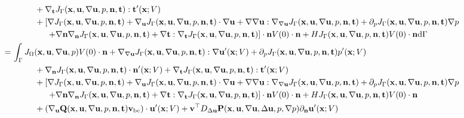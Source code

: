 \documentclass[oneside]{book}
\numberwithin{equation}{section}
\begin{document}
\begin{enumerate}[leftmargin=0in]
\begin{align*}
        &\hspace{1cm}+ \nabla_{\bf t}J_\Gamma({\bf x},{\bf u},\nabla{\bf u},p,{\bf n},{\bf t}):{\bf t}'({\bf x};V)\\
        &\hspace{1cm}+ \left[\nabla J_\Gamma({\bf x},{\bf u},\nabla{\bf u},p,{\bf n},{\bf t}) + \nabla_{\bf u}J_\Gamma({\bf x},{\bf u},\nabla{\bf u},p,{\bf n},{\bf t})\cdot\nabla{\bf u} + \nabla\nabla{\bf u}:\nabla_{\nabla{\bf u}}J_\Gamma({\bf x},{\bf u},\nabla{\bf u},p,{\bf n},{\bf t}) + \partial_pJ_\Gamma({\bf x},{\bf u},\nabla{\bf u},p,{\bf n},{\bf t})\nabla p\right.\\
        &\hspace{15mm} \left.+ \nabla{\bf n}\nabla_{\bf n}J_\Gamma({\bf x},{\bf u},\nabla{\bf u},p,{\bf n},{\bf t}) + \nabla{\bf t}:\nabla_{\bf t}J_\Gamma({\bf x},{\bf u},\nabla{\bf u},p,{\bf n},{\bf t})\right]\cdot{\bf n}V(0)\cdot{\bf n} + HJ_\Gamma({\bf x},{\bf u},\nabla{\bf u},p,{\bf n},{\bf t})V(0)\cdot{\bf n}{\rm d}\Gamma\\
        =&\, \int_\Gamma J_\Omega({\bf x},{\bf u},\nabla{\bf u},p)V(0)\cdot{\bf n} + \nabla_{\nabla{\bf u}}J_\Gamma({\bf x},{\bf u},\nabla{\bf u},p,{\bf n},{\bf t}):\nabla{\bf u}'({\bf x};V) + \partial_pJ_\Gamma({\bf x},{\bf u},\nabla{\bf u},p,{\bf n},{\bf t})p'({\bf x};V)\\
        &\hspace{1cm}+ \nabla_{\bf n}J_\Gamma({\bf x},{\bf u},\nabla{\bf u},p,{\bf n},{\bf t})\cdot{\bf n}'({\bf x};V) + \nabla_{\bf t}J_\Gamma({\bf x},{\bf u},\nabla{\bf u},p,{\bf n},{\bf t}):{\bf t}'({\bf x};V)\\
        &\hspace{1cm}+ \left[\nabla J_\Gamma({\bf x},{\bf u},\nabla{\bf u},p,{\bf n},{\bf t}) + \nabla_{\bf u}J_\Gamma({\bf x},{\bf u},\nabla{\bf u},p,{\bf n},{\bf t})\cdot\nabla{\bf u} + \nabla\nabla{\bf u}:\nabla_{\nabla{\bf u}}J_\Gamma({\bf x},{\bf u},\nabla{\bf u},p,{\bf n},{\bf t}) + \partial_pJ_\Gamma({\bf x},{\bf u},\nabla{\bf u},p,{\bf n},{\bf t})\nabla p\right.\\
        &\hspace{15mm} \left.+ \nabla{\bf n}\nabla_{\bf n}J_\Gamma({\bf x},{\bf u},\nabla{\bf u},p,{\bf n},{\bf t}) + \nabla{\bf t}:\nabla_{\bf t}J_\Gamma({\bf x},{\bf u},\nabla{\bf u},p,{\bf n},{\bf t})\right]\cdot{\bf n}V(0)\cdot{\bf n} + HJ_\Gamma({\bf x},{\bf u},\nabla{\bf u},p,{\bf n},{\bf t})V(0)\cdot{\bf n}\\
        &\hspace{1cm}+ (\nabla_{\bf u}{\bf Q}({\bf x},{\bf u},\nabla{\bf u},p,{\bf n},{\bf t}){\bf v}_{\rm bc})\cdot{\bf u}'({\bf x};V) + {\bf v}^\top D_{\Delta{\bf u}}{\bf P}({\bf x},{\bf u},\nabla{\bf u},\Delta{\bf u},p,\nabla p)\partial_{\bf n}{\bf u}'({\bf x};V)\\

\end{align*}
\end{enumerate}
\end{document}
